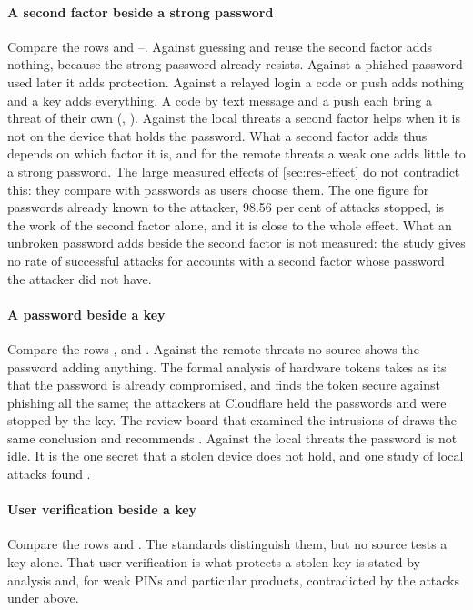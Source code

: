 \paragraph{A second factor beside a strong password}
Compare the rows  and --.
Against guessing and reuse the second factor adds nothing, because the
strong password already resists.
Against a phished password used later it adds protection.
Against a relayed login a code or push adds nothing and a key adds
everything.
A code by text message and a push each bring a threat of their own
(, ).
Against the local threats a second factor helps when it is not on the
device that holds the password.
What a second factor adds thus depends on which factor it is, and for
the remote threats a weak one adds little to a strong password.
The large measured effects of \cref{sec:res-effect} do not contradict
this: they compare with passwords as users choose them.
The one figure for passwords already known to the attacker, 98.56 per
cent of attacks stopped, is the work of the second factor alone, and it
is close to the whole effect.
What an unbroken password adds beside the second factor is not measured:
the study gives no rate of successful attacks for accounts with a second
factor whose password the attacker did not have.

\paragraph{A password beside a key}
Compare the rows ,  and .
Against the remote threats no source shows the password adding
anything.
The formal analysis of hardware tokens takes as its
 that the
password is already compromised, and finds the token secure against
phishing all the same; the attackers at Cloudflare held the passwords
and were stopped by the key.
The review board that examined the intrusions of  draws the
same conclusion and recommends
.
Against the local threats the password is not idle.
It is the one secret that a stolen device does not hold, and one study
of local attacks found
.

\paragraph{User verification beside a key}
Compare the rows  and .
The standards distinguish them, but no source tests a key alone.
That user verification is what protects a stolen key is stated by
analysis and, for weak PINs and particular products, contradicted by
the attacks under  above.

